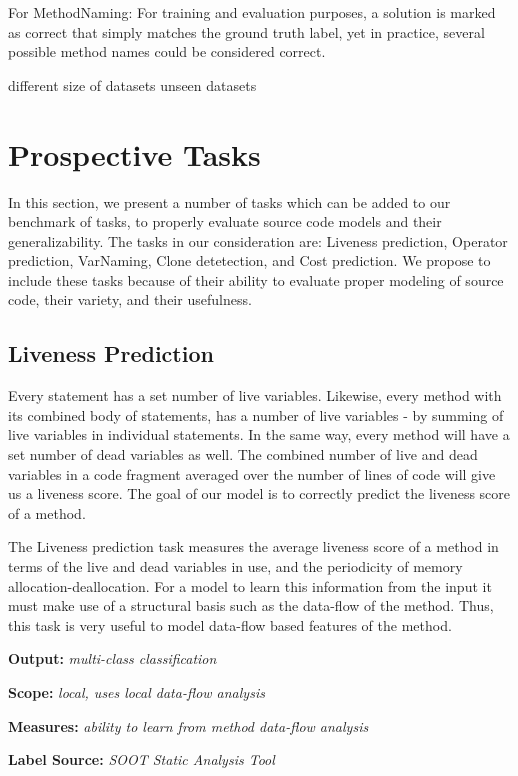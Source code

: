 \documentclass[sigplan,review,anonymous]{acmart}\settopmatter{printfolios=true,printccs=false,printacmref=false}
\begin{document}
 
For MethodNaming: For training and evaluation purposes, a solution is marked as correct that simply matches the ground truth label, yet in practice, several possible method names could be considered correct.

different size of datasets
unseen datasets


\section{Prospective Tasks}
In this section, we present a number of tasks which can be added to our benchmark of tasks, to properly evaluate source code models and their generalizability. The tasks in our consideration are: Liveness prediction, Operator prediction, VarNaming, Clone detetection, and Cost prediction. We propose to include these tasks because of their ability to evaluate proper modeling of source code, their variety, and their usefulness. 

\subsection{Liveness Prediction}
Every statement has a set number of live variables. Likewise, every method with its combined body of statements, has a number of live variables - by summing of live variables in individual statements. In the same way, every method will have a set number of dead variables as well. The combined number of live and dead variables in a code fragment averaged over the number of lines of code will give us a liveness score. The goal of our model is to correctly predict the liveness score of a method. 

The Liveness prediction task measures the average liveness score of a method in terms of the live and dead variables in use, and the periodicity of memory allocation-deallocation. For a model to learn this information from the input it must make use of a structural basis such as the data-flow of the method. Thus, this task is very useful to model data-flow based features of the method. \newline 

\noindent
\textbf{Output:} \textit{multi-class classification}

\noindent
\textbf{Scope:} \textit{local, uses local data-flow analysis}

\noindent
\textbf{Measures:} \textit{ability to learn from method data-flow analysis}

\noindent
\textbf{Label Source:} \textit{SOOT Static Analysis Tool}
\end{document}
